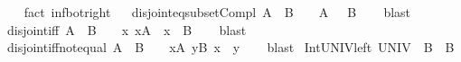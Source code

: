\begin{isabellebody}
%
\isadelimproof
\ \ %
\endisadelimproof
%
\isatagproof
{}\isamarkupfalse%
\ {\isacharparenleft}{\kern0pt}fact\ inf{\isacharunderscore}{\kern0pt}bot{\isacharunderscore}{\kern0pt}right{\isacharparenright}{\kern0pt}%
\endisatagproof
{\isafoldproof}%
%
\isadelimproof
%
\endisadelimproof
\ \isanewline
\isanewline
{}\isamarkupfalse%
\ disjoint{\isacharunderscore}{\kern0pt}eq{\isacharunderscore}{\kern0pt}subset{\isacharunderscore}{\kern0pt}Compl{\isacharcolon}{\kern0pt}\ {\isachardoublequoteopen}A\ {\isasyminter}\ B\ {\isacharequal}{\kern0pt}\ {\isacharbraceleft}{\kern0pt}{\isacharbraceright}{\kern0pt}\ {\isasymlongleftrightarrow}\ A\ {\isasymsubseteq}\ {\isacharminus}{\kern0pt}\ B{\isachardoublequoteclose}\isanewline
%
\isadelimproof
\ \ %
\endisadelimproof
%
\isatagproof
{}\isamarkupfalse%
\ blast%
\endisatagproof
{\isafoldproof}%
%
\isadelimproof
\isanewline
%
\endisadelimproof
\isanewline
{}\isamarkupfalse%
\ disjoint{\isacharunderscore}{\kern0pt}iff{\isacharcolon}{\kern0pt}\ {\isachardoublequoteopen}A\ {\isasyminter}\ B\ {\isacharequal}{\kern0pt}\ {\isacharbraceleft}{\kern0pt}{\isacharbraceright}{\kern0pt}\ {\isasymlongleftrightarrow}\ {\isacharparenleft}{\kern0pt}{\isasymforall}x{\isachardot}{\kern0pt}\ x{\isasymin}A\ {\isasymlongrightarrow}\ x\ {\isasymnotin}\ B{\isacharparenright}{\kern0pt}{\isachardoublequoteclose}\isanewline
%
\isadelimproof
\ \ %
\endisadelimproof
%
\isatagproof
{}\isamarkupfalse%
\ blast%
\endisatagproof
{\isafoldproof}%
%
\isadelimproof
\isanewline
%
\endisadelimproof
\isanewline
{}\isamarkupfalse%
\ disjoint{\isacharunderscore}{\kern0pt}iff{\isacharunderscore}{\kern0pt}not{\isacharunderscore}{\kern0pt}equal{\isacharcolon}{\kern0pt}\ {\isachardoublequoteopen}A\ {\isasyminter}\ B\ {\isacharequal}{\kern0pt}\ {\isacharbraceleft}{\kern0pt}{\isacharbraceright}{\kern0pt}\ {\isasymlongleftrightarrow}\ {\isacharparenleft}{\kern0pt}{\isasymforall}x{\isasymin}A{\isachardot}{\kern0pt}\ {\isasymforall}y{\isasymin}B{\isachardot}{\kern0pt}\ x\ {\isasymnoteq}\ y{\isacharparenright}{\kern0pt}{\isachardoublequoteclose}\isanewline
%
\isadelimproof
\ \ %
\endisadelimproof
%
\isatagproof
{}\isamarkupfalse%
\ blast%
\endisatagproof
{\isafoldproof}%
%
\isadelimproof
\isanewline
%
\endisadelimproof
\isanewline
{}\isamarkupfalse%
\ Int{\isacharunderscore}{\kern0pt}UNIV{\isacharunderscore}{\kern0pt}left{\isacharcolon}{\kern0pt}\ {\isachardoublequoteopen}UNIV\ {\isasyminter}\ B\ {\isacharequal}{\kern0pt}\ B{\isachardoublequoteclose}\isanewline

\end{isabellebody}
